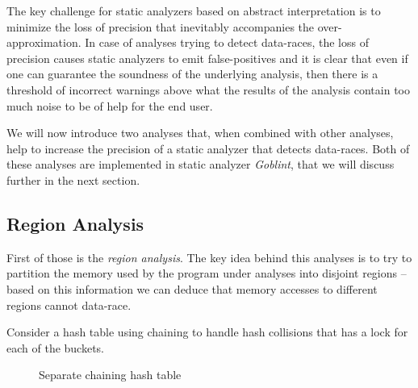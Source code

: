 \documentclass[..thesis.tex]{subfiles}
\begin{document}
The key challenge for static analyzers based on abstract interpretation is to minimize the loss of precision that inevitably accompanies the over-approximation.
In case of analyses trying to detect data-races, the loss of precision causes static analyzers to emit false-positives and it is clear
that even if one can guarantee the soundness of the underlying analysis,
then there is a threshold of incorrect warnings above what the results of the analysis contain too much noise to be of help for the end user.


We will now introduce two analyses that, when combined with other analyses, help to increase the precision of a static analyzer that detects data-races. Both of these analyses are implemented in static analyzer \textit{Goblint}, that we will discuss further in the next section.



\subsection{Region Analysis}

First of those is the \textit{region analysis}. The key idea behind this analyses is to try to partition the memory used by the program under analyses into disjoint regions -- based on this information we can deduce that memory accesses to different regions cannot data-race.


Consider a hash table using chaining to handle hash collisions that has a lock for each of the buckets.


\begin{figure}[H]
  \centering
  \caption{Separate chaining hash table} 
\end{figure}
\end{document}
